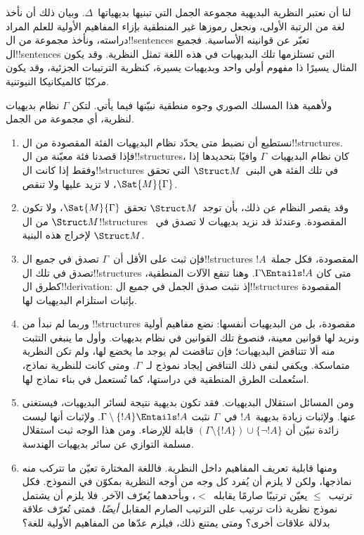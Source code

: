 \documentclass[../../../include/open-logic-section]{subfiles}
\begin{document}
\begin{explain}
لنا أن نعتبر النظرية البديهية مجموعة الجمل التي تبنيها
بديهياتها~$\Delta$. وبيان ذلك أن نأخذ لغة من الرتبة الأولى،
ونجعل رموزها غير المنطقية بإزاء المفاهيم الأولية للعلم المراد
دراسته، ونأخذ مجموعة من ال!!{sentence}s تعبّر عن قوانينه الأساسية.
فجميع ال!!{sentence}s التي تستلزمها تلك البديهيات في هذه اللغة
تمثل النظرية. وقد يكون المثال يسيرًا ذا مفهوم أولي واحد وبديهيات
يسيرة، كنظرية الترتيبات الجزئية، وقد يكون مركبًا كالميكانيكا
النيوتنية.

ولأهمية هذا المسلك الصوري وجوه منطقية نبيّنها فيما يأتي.
لتكن $\Gamma$ نظام بديهيات لنظرية، أي مجموعة من الجمل.
\begin{enumerate}
\item نستطيع أن نضبط متى يحدّد نظام البديهيات الفئة المقصودة من
  ال!!{structure}s. فإذا قصدنا فئة معيّنة من ال!!{structure}s،
  كان نظام البديهيات~$\Gamma$ وافيًا بتحديدها إذا وفقط إذا كانت
  ال!!{structure}s في تلك الفئة هي البنى~$\Struct M$ التي تحقق
  $\Sat{M}{\Gamma}$، لا تزيد عليها ولا تنقص.
\item وقد يقصر النظام عن ذلك، بأن توجد~$\Struct M$ تحقق
  $\Sat{M}{\Gamma}$، ولا تكون $\Struct M$ من ال!!{structure}s
  المقصودة. وعندئذ قد نزيد بديهيات لا تصدق
  في~$\Struct M$ لإخراج هذه البنية.
\item فإن ثبت على الأقل أن~$\Gamma$ تصدق في جميع
  ال!!{structure}s المقصودة، فكل جملة~$!A$ تصدق في تلك
  ال!!{structure}s متى كان $\Gamma \Entails !A$. وهنا تنفع
  الآلات المنطقية، كطرق ال!!{derivation}: إذ نثبت صدق الجمل
  في جميع ال!!{structure}s المقصودة بإثبات استلزام البديهيات لها.
\item وربما لم نبدأ من !!{structure}s مقصودة، بل من البديهيات
  أنفسها: نضع مفاهيم أولية ونريد لها قوانين معينة، فنصوغ تلك
  القوانين في نظام بديهيات. وأول ما ينبغي التثبت منه ألا تتناقض
  البديهيات؛ فإن تناقضت لم يوجد ما يخضع لها، ولم تكن النظرية
  متماسكة. ويكفي لنفي ذلك التناقض إيجاد نموذج
  لـ~$\Gamma$. ومتى كانت للنظرية نماذج، استُعملت الطرق المنطقية
  في دراستها، كما تُستعمل في بناء نماذج لها.
\item ومن المسائل استقلال البديهيات. فقد تكون بديهية نتيجة
  لسائر البديهيات، فيستغنى عنها. ولإثبات زيادة بديهية~$!A$
  في~$\Gamma$ نثبت
  $\Gamma \setminus \{!A\} \Entails !A$. ولإثبات أنها ليست زائدة
  نبيّن أن
  $(\Gamma \setminus \{!A\}) \cup \{\lnot !A\}$ قابلة للإرضاء.
  ومن هذا الوجه ثبت استقلال مسلمة التوازي عن سائر بديهيات
  الهندسة.
\item ومنها قابلية تعريف المفاهيم داخل النظرية. فاللغة المختارة
  تعيّن ما تتركب منه نماذجها، ولكن لا يلزم أن يُفرد كل وجه من
  أوجه النظرية بمكوّن في النموذج. فكل ترتيب~$\le$ يعيّن ترتيبًا
  صارمًا يقابله~$<$، وبأحدهما يُعرّف الآخر. فلا يلزم أن يشتمل
  نموذج نظرية ذات ترتيب على الترتيب الصارم المقابل
  \emph{أيضًا}. فمتى تُعرّف علاقة بدلالة علاقات أخرى؟ ومتى يمتنع
  ذلك، فيلزم عدّها من المفاهيم الأولية للغة؟
\end{enumerate}
\end{explain}
\end{document}
